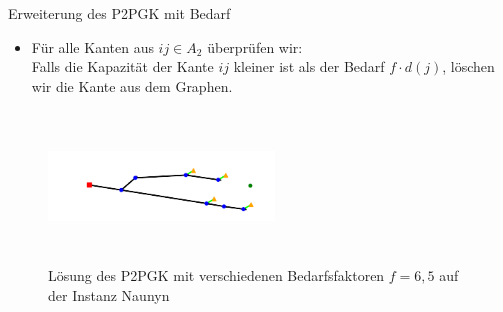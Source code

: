 \documentclass{beamer}
\begin{document}
		\begin{frame}{Erweiterung des P2PGK mit Bedarf}
			\begin{itemize}
				\item F\"ur alle Kanten aus $ij \in A_2$ \"uberpr\"ufen wir:\\
				Falls die Kapazit\"at der Kante $ij$ kleiner ist als der Bedarf  $f \cdot d(j)$,
				l\"oschen wir die Kante aus dem Graphen.
			\end{itemize}
			\begin{figure}[h]
				\centering
				\includegraphics[height=4cm, width=6cm]{./Bilder/P2PGK_Naunyn_demand6_5_duration0}
				\caption{Lösung des P2PGK mit verschiedenen Bedarfsfaktoren $f = 6,5$ auf der Instanz Naunyn}
			\end{figure}
		\end{frame}
		
\end{document}
